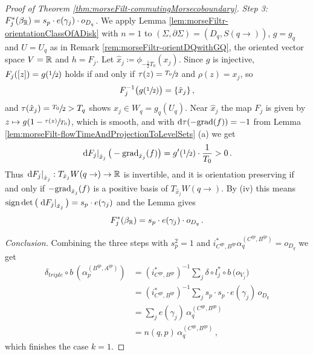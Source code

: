 \begin{proof}[Proof of Theorem \ref{thm:morseFilt-commutingMorsecoboundary}]
\emph{Step 3: $F_j^*(\beta_{\mathbb{R}})=s_p\cdot e(\gamma_j)\cdot o_{D_q}$.}
We apply Lemma \ref{lem:morseFiltr-orientationClassOfADisk} with $n=1$ to $(\Sigma,\partial\Sigma)=(D_q,S(q\to))$, $g=g_q$ and $U=U_q$ as in Remark \ref{rem:morseFiltr-orientDQwithGQ}, the oriented vector space $V=\mathbb{R}$ and $h=F_j$. Let $\hat{x}_j\coloneq\phi_{-\frac{1}{2}T_0}(x_j)$. Since $g$ is injective, $F_j([z])=g(\sfrac{1}{2})$ holds if and only if $\tau(z)=\sfrac{T_0}{2}$ and $\rho(z)=x_j$, so
\begin{equation*}
	F_j^{-1}\big(g(\sfrac{1}{2})\big)=\{\hat{x}_j\}\,,
\end{equation*}
and $\tau(\hat{x}_j)=\sfrac{T_0}{2}>T_q$ shows $\hat{x}_j\in W_q=g_q(U_q)$. Near $\hat{x}_j$ the map $F_j$ is given by $z\mapsto g(1-\sfrac{\tau(z)}{T_0})$, which is smooth, and with $\mathop{}\!\mathrm{d}\tau(-\mathrm{grad}(f))=-1$ from Lemma \ref{lem:morseFilt-flowTimeAndProjectionToLevelSets} (a) we get
\begin{equation*}
	\left.\mathop{}\!\mathrm{d} F_j\right|_{\hat{x}_j}\big(-\mathrm{grad}_{\hat{x}_j}(f)\big)=g'(\sfrac{1}{2})\cdot\frac{1}{T_0}>0\,.
\end{equation*}
Thus $\left.\mathop{}\!\mathrm{d} F_j\right|_{\hat{x}_j}:T_{\hat{x}_j}W(q\to)\to\mathbb{R}$ is invertible, and it is orientation preserving if and only if $-\mathrm{grad}_{\hat{x}_j}(f)$ is a positive basis of $T_{\hat{x}_j}W(q\to)$. By (iv) this means $\mathrm{sign}\det\big(\left.\mathop{}\!\mathrm{d} F_j\right|_{\hat{x}_j}\big)=s_p\cdot e(\gamma_j)$ and the Lemma gives
\begin{equation*}
	F_j^*(\beta_{\mathbb{R}})=s_p\cdot e(\gamma_j)\cdot o_{D_q}\,.
\end{equation*}
 
\emph{Conclusion.} Combining the three steps with $s_p^2=1$ and $i^*_{C^{qp},B^{qp}}\alpha_q^{(C^{qp},B^{qp})}=o_{D_q}$ we get
\begin{align*}
	\delta_{triple}\circ b\,(\alpha_p^{(B^{qp},A^{qp})})
	&=(i^*_{C^{qp},B^{qp}})^{-1} \sum_j \delta\circ l_j^*\circ b\,\big(o_{V_j}\big)\\
	&=(i^*_{C^{qp},B^{qp}})^{-1} \sum_j s_p\cdot s_p\cdot e(\gamma_j)\, o_{D_q}\\
	&=\sum_j e(\gamma_j)\, \alpha_q^{(C^{qp},B^{qp})}\\
	&=n(q,p)\, \alpha_q^{(C^{qp},B^{qp})}\,,
\end{align*}
which finishes the case $k=1$.


\end{proof}
